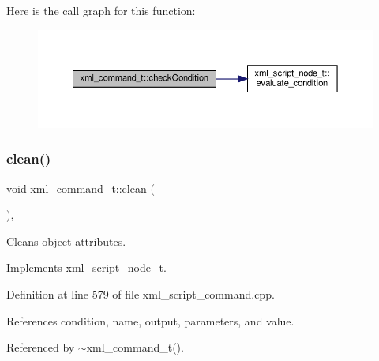 Here is the call graph for this function\+:
\nopagebreak
\begin{figure}[H]
\begin{center}
\leavevmode
\includegraphics[width=350pt]{d4/db0/classxml__command__t_a0bd9c4cf582f671898afd9ec1602a1dd_cgraph}
\end{center}
\end{figure}
\mbox{\label{classxml__command__t_ace4f9e713601beb9a850d2459550789f}} 
\subsubsection{\texorpdfstring{clean()}{clean()}}
{\footnotesize\ttfamily void xml\+\_\+command\+\_\+t\+::clean (\begin{DoxyParamCaption}{ }\end{DoxyParamCaption})\hspace{0.3cm}{\ttfamily [override]}, {\ttfamily [virtual]}}



Cleans object attributes. 



Implements \hyperlink{classxml__script__node__t_a2be778f2caef531c55b36c2bf2c996e2}{xml\+\_\+script\+\_\+node\+\_\+t}.



Definition at line 579 of file xml\+\_\+script\+\_\+command.\+cpp.



References condition, name, output, parameters, and value.



Referenced by $\sim$xml\+\_\+command\+\_\+t().

